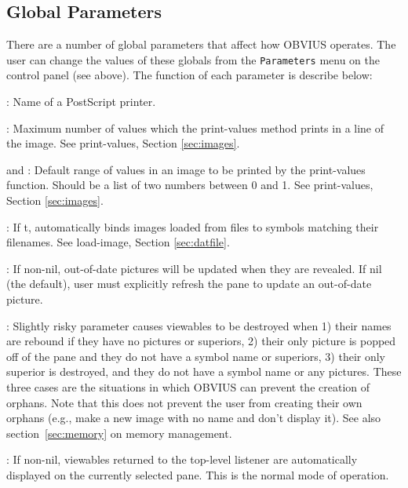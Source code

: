 \subsection{Global Parameters}

There are a number of global parameters that affect how OBVIUS
operates.  The user can change the values of these globals from the
{\tt Parameters} menu on the control panel (see above).  The function
of each parameter is describe below:

\begin{description}
\item {}: Name of a PostScript printer.

\item {}: Maximum number of values which the
print-values method prints in a line of the image.  See print-values,
Section \ref{sec:images}.

\item {} and : Default range of
values in an image to be printed by the print-values function.  Should
be a list of two numbers between 0 and 1.  See print-values, Section
\ref{sec:images}.

\item {}: If t, automatically binds images
loaded from files to symbols matching their filenames.  See
load-image, Section \ref{sec:datfile}.

\item {}: If non-nil, out-of-date pictures will
be updated when they are revealed.  If nil (the default), user must
explicitly refresh the pane to update an out-of-date picture.

\item {}: Slightly risky parameter causes
viewables to be destroyed when 1) their names are rebound if they have no
pictures or superiors, 2) their only picture is popped off of the pane
and they do not have a symbol name or superiors, 3) their only
superior is destroyed, and they do not have a symbol name or any
pictures.  These three cases are the situations in which OBVIUS can
prevent the creation of orphans.  Note that this does not prevent the
user from creating their own orphans (e.g., make a new image with no
name and don't display it).  See also section~\ref{sec:memory} on
memory management.

\item {}: If non-nil, viewables returned to the
top-level listener are automatically displayed on the currently
selected pane.  This is the normal mode of operation.


\end{description}
